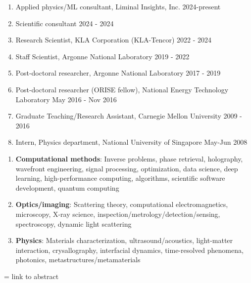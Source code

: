 \documentclass[11pt]{article}
\begin{document}
\begin{enumerate}
    \item Applied physics/ML consultant, Liminal Insights, Inc. \hfill 2024-present
    \item Scientific consultant \hfill 2024 - 2024
    \item Research Scientist, KLA Corporation (KLA-Tencor) \hfill 2022 - 2024
    \item Staff Scientist, Argonne National Laboratory \hfill 2019 - 2022
    \item Post-doctoral researcher, Argonne National Laboratory \hfill 2017 - 2019
    \item Post-doctoral researcher (ORISE fellow), National Energy Technology Laboratory  \hfill May 2016 - Nov 2016
    \item Graduate Teaching/Research Assistant, Carnegie Mellon University \hfill 2009 - 2016
    \item Intern, Physics department, National University of Singapore \hfill May-Jun 2008 
\end{enumerate} 

\begin{enumerate}
    \item \textbf{Computational methods}: Inverse problems, phase retrieval, holography, wavefront engineering, signal processing, optimization, data science, deep learning, high-performance computing, algorithms, scientific software development, quantum computing
    \item \textbf{Optics/imaging}: Scattering theory, computational electromagnetics, microscopy, X-ray science, inspection/metrology/detection/sensing, spectroscopy, dynamic light scattering 
    \item \textbf{Physics}: Materials characterization, ultrasound/acoustics, light-matter interaction, crysallography, interfacial dynamics, time-resolved phenomena, photonics, metastructures/metamaterials
\end{enumerate} 

 = link to abstract
\end{document}
